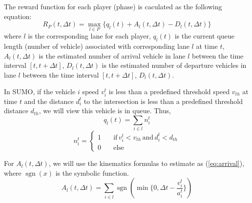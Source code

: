 \documentclass[a4paper, 10pt, conference]{ieeeconf}      %
\DeclareMathOperator*{\sgn}{sgn}
\begin{document}
The reward function for each player (phase) is caculated as the following equation:
\begin{equation}
        R_P(t,\Delta t)=\max\limits_{l\in P}\{q_l(t)+A_l(t,\Delta t)-D_l(t,\Delta t)\}
\end{equation}
where $l$ is the corresponding lane for each player, $q_l(t)$ is the current queue length (number of vehicle) associated with corresponding lane 
$l$ at time $t$, $A_l(t,\Delta t)$ is the estimated number of arrival vehicle in lane $l$ between the time interval $[t,t+\Delta t]$, $D_l(t,\Delta t)$
is the estimated number of departure vehicles in lane $l$ between the time interval $[t,t+\Delta t]$, $D_l(t,\Delta t)$. 

In SUMO, if the vehicle $i$ speed $v_i^t$ is less than a predefined threshold speed $v_{th}$ at time $t$ and the distance $d_i^t$ to the intersection
is less than a predefined threshold distance $d_{th}$, we will view this vehicle is in queue. Thus, 
\begin{equation}
        q_l(t)=\sum_{i\in l}n_i^t
\end{equation}
\begin{equation}
        n_i^t=\begin{cases}
                1&\quad\text{if}\,v_i^t<v_{th}\,\text{and}\,d_i^t<d_{th}\\
                0&\quad\text{else}
        \end{cases}
\end{equation}

For $A_l(t,\Delta t)$, we will use the kinematics formulas to estimate as (\ref{eq:arrival}), where $\sgn(x)$ is the symbolic function.
\begin{equation}
        \label{eq:arrival}
        A_l(t,\Delta t)=\sum_{i\in l}\sgn(\min\{0,\Delta t-\frac{v_i^t}{a_i^t}\})
\end{equation}
\end{document}

